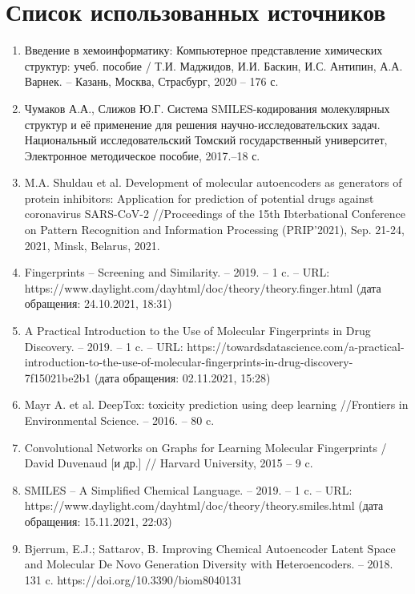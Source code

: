 \documentclass[a4paper,14pt]{extreport}
\begin{document}
  \chapter*{Список использованных источников}
  \label{c:literature}
\begin{enumerate}
\item \label{itm:lit1} Введение в хемоинформатику: Компьютерное представление химических структур: учеб. пособие / Т.И. Маджидов, И.И. Баскин, И.С. Антипин, А.А. Варнек. – Казань, Москва, Страсбург, 2020 – 176 с.
\item \label{itm:lit2} Чумаков А.А., Слижов Ю.Г. Система SMILES-кодирования молекулярных структур и её применение для решения научно-исследовательских задач. Национальный исследовательский Томский государственный университет, Электронное методическое пособие, 2017.–18 с.
    
    \item \label{itm:lit4} M.A. Shuldau et al. Development of molecular autoencoders as generators of protein inhibitors:
Application for prediction of potential drugs against coronavirus SARS-CoV-2 //Proceedings of
the 15th Ibterbational Conference on Pattern Recognition and Information Processing
(PRIP’2021), Sep. 21-24, 2021, Minsk, Belarus, 2021.
	\item \label{itm:lit5} Fingerprints – Screening and Similarity. – 2019. – 1 c. – URL: https://www.daylight.com/dayhtml/doc/theory/theory.finger.html  (дата обращения: 24.10.2021, 18:31)
	\item \label{itm:lit6} A Practical Introduction to the Use of Molecular Fingerprints in Drug Discovery. – 2019. – 1 c. – URL: https://towardsdatascience.com/a-practical-introduction-to-the-use-of-molecular-fingerprints-in-drug-discovery-7f15021be2b1 (дата обращения: 02.11.2021, 15:28)
	
	\item \label{itm:toxic} Mayr A. et al. DeepTox: toxicity prediction using deep learning //Frontiers in Environmental Science. – 2016. – 80 c.
	
	\item \label{itm:lit7} Convolutional Networks on Graphs for Learning Molecular Fingerprints / David Duvenaud [и др.] // Harvard University, 2015 – 9 c.
	\item \label{itm:lit8} SMILES – A Simplified Chemical Language. – 2019. – 1 c. – URL: https://www.daylight.com/dayhtml/doc/theory/theory.smiles.html (дата обращения: 15.11.2021, 22:03)

	\item \label{itm:lit9} Bjerrum, E.J.; Sattarov, B. Improving Chemical Autoencoder Latent Space and Molecular De Novo Generation Diversity with Heteroencoders. – 2018. 131 c. https://doi.org/10.3390/biom8040131 
    

\end{enumerate}
\end{document}
